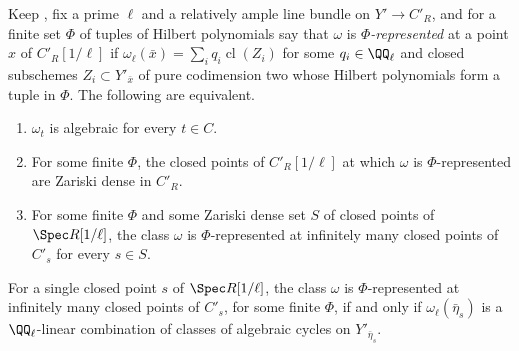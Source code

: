 \begin{theorem}\label{thm:modpdensity}
Keep , fix a prime $\ell$ and a relatively ample line bundle
on $Y'\to C'_{R}$, and for a finite set $\Phi$ of tuples of Hilbert
polynomials say that $\omega$ is \emph{$\Phi$-represented} at a point $x$ of
$C'_{R}[1/\ell]$ if $\omega_{\ell}(\bar{x})=\sum_{i}q_{i}\operatorname{cl}(Z_{i})$
for some $q_{i}\in\QQ_{\ell}$ and closed subschemes $Z_{i}\subset Y'_{\bar{x}}$
of pure codimension two whose Hilbert polynomials form a tuple in $\Phi$. The
following are equivalent.
\begin{enumerate}[label=\textup{(\alph*)},leftmargin=2.6em,itemsep=2pt]
\item $\omega_{t}$ is algebraic for every $t\in C$.
\item For some finite $\Phi$, the closed points of $C'_{R}[1/\ell]$ at which
  $\omega$ is $\Phi$-represented are Zariski dense in $C'_{R}$.
\item For some finite $\Phi$ and some Zariski dense set $S$ of closed points of
  $\Spec R[1/\ell]$, the class $\omega$ is $\Phi$-represented at infinitely
  many closed points of $C'_{s}$ for every $s\in S$.
\end{enumerate}
For a single closed point $s$ of $\Spec R[1/\ell]$, the class $\omega$ is
$\Phi$-represented at infinitely many closed points of $C'_{s}$, for some
finite $\Phi$, if and only if $\omega_{\ell}(\bar\eta_{s})$ is a
$\QQ_{\ell}$-linear combination of classes of algebraic cycles on
$Y'_{\bar\eta_{s}}$.
\end{theorem}

